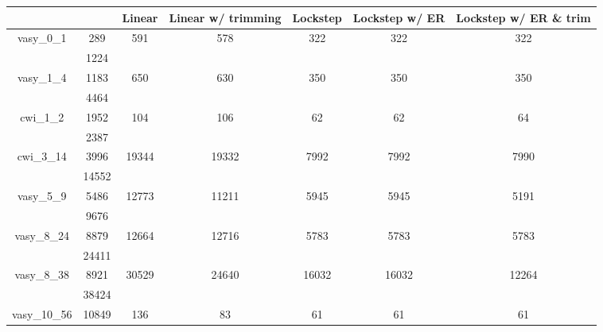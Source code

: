 \documentclass[../master/master.tex]{subfiles}
\begin{document}
\begin{center}
\begin{tabular}{ |c|c||c||c||c||c||c|| } 
\hline
 \multicolumn{2}{|c||}{} & Linear & Linear w/ trimming & Lockstep & Lockstep w/ ER & Lockstep w/ ER \& trim \\
\hline
\multirow{2}{3.8em}{vasy\_0\_1} & 289 & \multirow{2}{3.8em}{591} & \multirow{2}{3.8em}{578} & \multirow{2}{3.8em}{322} & \multirow{2}{3.8em}{322} & \multirow{2}{3.8em}{322} \\
\cline{2-2}
 & 1224  & & & & & \\
\hline
\multirow{2}{3.8em}{vasy\_1\_4} & 1183 & \multirow{2}{3.8em}{650} & \multirow{2}{3.8em}{630} & \multirow{2}{3.8em}{350} & \multirow{2}{3.8em}{350} & \multirow{2}{3.8em}{350} \\
\cline{2-2}
 & 4464  & & & & & \\
\hline
\multirow{2}{3.8em}{cwi\_1\_2} & 1952 & \multirow{2}{3.8em}{104} & \multirow{2}{3.8em}{106} & \multirow{2}{3.8em}{62} & \multirow{2}{3.8em}{62} & \multirow{2}{3.8em}{64} \\
\cline{2-2}
 & 2387  & & & & & \\
\hline
\multirow{2}{3.8em}{cwi\_3\_14} & 3996 & \multirow{2}{3.8em}{19344} & \multirow{2}{3.8em}{19332} & \multirow{2}{3.8em}{7992} & \multirow{2}{3.8em}{7992} & \multirow{2}{3.8em}{7990} \\
\cline{2-2}
 & 14552  & & & & & \\
\hline
\multirow{2}{3.8em}{vasy\_5\_9} & 5486 & \multirow{2}{3.8em}{12773} & \multirow{2}{3.8em}{11211} & \multirow{2}{3.8em}{5945} & \multirow{2}{3.8em}{5945} & \multirow{2}{3.8em}{5191} \\
\cline{2-2}
 & 9676  & & & & & \\
\hline
\multirow{2}{3.8em}{vasy\_8\_24} & 8879 & \multirow{2}{3.8em}{12664} & \multirow{2}{3.8em}{12716} & \multirow{2}{3.8em}{5783} & \multirow{2}{3.8em}{5783} & \multirow{2}{3.8em}{5783} \\
\cline{2-2}
 & 24411  & & & & & \\
\hline
\multirow{2}{3.8em}{vasy\_8\_38} & 8921 & \multirow{2}{3.8em}{30529} & \multirow{2}{3.8em}{24640} & \multirow{2}{3.8em}{16032} & \multirow{2}{3.8em}{16032} & \multirow{2}{3.8em}{12264} \\
\cline{2-2}
 & 38424  & & & & & \\
\hline
\multirow{2}{3.8em}{vasy\_10\_56} & 10849 & \multirow{2}{3.8em}{136} & \multirow{2}{3.8em}{83} & \multirow{2}{3.8em}{61} & \multirow{2}{3.8em}{61} & \multirow{2}{3.8em}{61} \\

\end{tabular}
\end{center}
\end{document}
